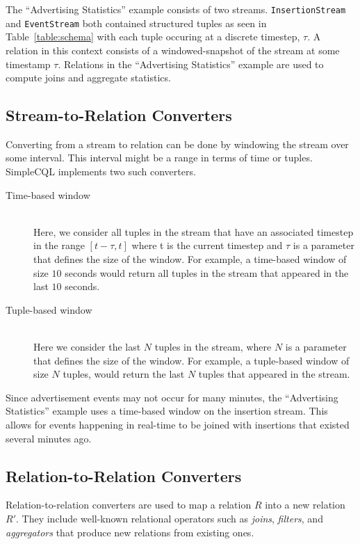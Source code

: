 \documentclass[a4paper, 10pt, conference]{IEEEconf}
\begin{document}
The ``Advertising Statistics'' example consists of two streams.  \texttt{InsertionStream} and \texttt{EventStream} both contained structured tuples as seen in Table~\ref{table:schema} with each tuple occuring at a discrete timestep, $\tau$.  A relation in this context consists of a windowed-snapshot of the stream at some timestamp $\tau$.  Relations in the ``Advertising Statistics'' example are used to compute joins and aggregate statistics.

\subsection{Stream-to-Relation Converters}
Converting from a stream to relation can be done by windowing the stream over some interval.  This interval might be a range in terms of time or tuples.  SimpleCQL implements two such converters.

\begin{description}
  \item[Time-based window] \hfill \\
  Here, we consider all tuples in the stream that have an associated timestep in the range $[t-\tau, t]$ where t is the current timestep and $\tau$ is a parameter that defines the size of the window. For example, a time-based window of size $10$ seconds would return all tuples in the stream that appeared in the last $10$ seconds.
  
  \item[Tuple-based window] \hfill \\
  Here we consider the last $N$ tuples in the stream, where $N$ is a parameter that defines the size of the window. For example, a tuple-based window of size $N$ tuples, would return the last $N$ tuples that appeared in the stream.
\end{description}

Since advertisement events may not occur for many minutes, the ``Advertising Statistics'' example uses a time-based window on the insertion stream.  This allows for events happening in real-time to be joined with insertions that existed several minutes ago.

\subsection{Relation-to-Relation Converters}

Relation-to-relation converters are used to map a relation $R$ into a new relation $R'$.  They include well-known relational operators such as \textit{joins}, \textit{filters}, and \textit{aggregators} that produce new relations from existing ones. 
\end{document}
